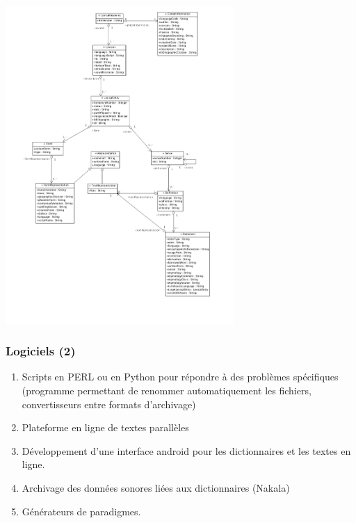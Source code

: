 \documentclass[xcolor=table]{beamer}
\begin{document}
  
    \begin{frame} 
  \includegraphics[width=0.65\textwidth]{../../../dev/lib/lmf/doc/uml/export/ClassDiagramCorePackage.png} \centering


   \end{frame}   
   
  \begin{frame} 
 \frametitle{Logiciels (2)}
 
\begin{enumerate}[<+->]
\item Scripts en PERL ou en Python pour répondre à des problèmes spécifiques (programme permettant de renommer automatiquement les fichiers, convertisseurs entre formats d'archivage)
\item Plateforme en ligne de textes parallèles
\item Développement d'une interface android pour les dictionnaires et les textes en ligne.
\item Archivage des données sonores liées aux dictionnaires (Nakala)
\item Générateurs de paradigmes.
\end{enumerate}
 
  \end{frame}     
 
\end{document}

